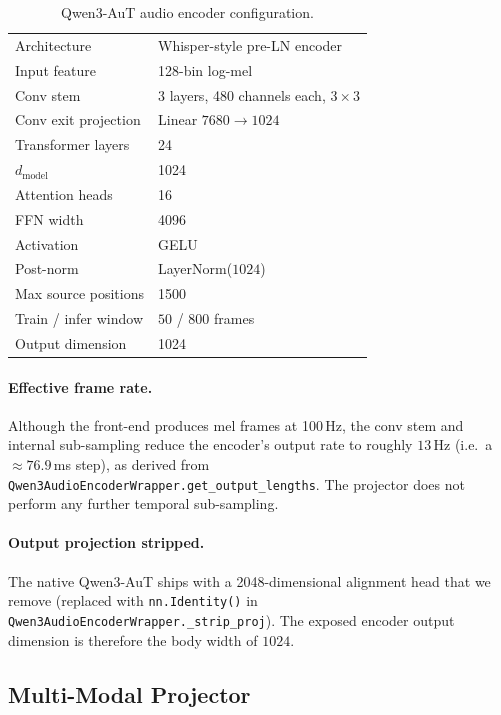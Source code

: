 \begin{table}[t]
  \caption{Qwen3-AuT audio encoder configuration.}
  \label{tab:enc}
  \centering
  \small
  \begin{tabular}{ll}
    \toprule
    Architecture            & Whisper-style pre-LN encoder \\
    Input feature           & 128-bin log-mel \\
    Conv stem               & 3 layers, 480 channels each, $3\!\times\!3$ \\
    Conv exit projection    & Linear $7680 \!\to\! 1024$ \\
    Transformer layers      & 24 \\
    $d_{\text{model}}$      & 1024 \\
    Attention heads         & 16 \\
    FFN width               & 4096 \\
    Activation              & GELU \\
    Post-norm               & LayerNorm($1024$) \\
    Max source positions    & 1500 \\
    Train / infer window    & $50$ / $800$ frames \\
    Output dimension        & 1024 \\
    \bottomrule
  \end{tabular}
\end{table}

\paragraph{Effective frame rate.}
Although the front-end produces mel frames at 100\,Hz, the conv stem and
internal sub-sampling reduce the encoder's output rate to roughly
$13$\,Hz (i.e.\ a $\approx 76.9$\,ms step), as derived from
\texttt{Qwen3AudioEncoderWrapper.get\_output\_lengths}. The projector
does not perform any further temporal sub-sampling.

\paragraph{Output projection stripped.}
The native Qwen3-AuT ships with a 2048-dimensional alignment head that
we remove (replaced with \texttt{nn.Identity()} in
\texttt{Qwen3AudioEncoderWrapper.\_strip\_proj}). The exposed encoder
output dimension is therefore the body width of $1024$.

\subsection{Multi-Modal Projector}
\label{subsec:projector}


